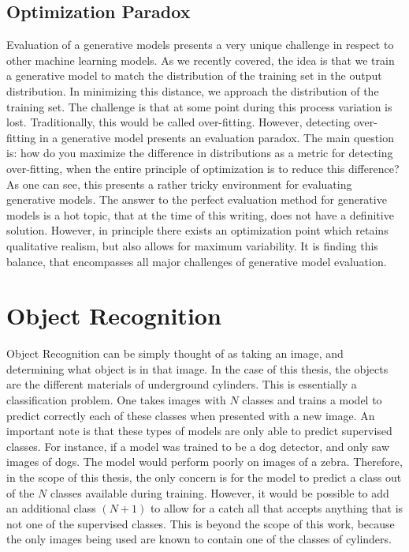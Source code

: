 \subsection{Optimization Paradox}\label{paradox}
Evaluation of a generative models presents a very unique challenge in respect to other machine learning models. As we recently covered, the idea is that we train a generative model to match the distribution of the training set in the output distribution. In minimizing this distance, we approach the distribution of the training set. The challenge is that at some point during this process variation is lost. Traditionally, this would be called over-fitting. However, detecting over-fitting in a generative model presents an evaluation paradox. The main question is: how do you maximize the difference in distributions as a metric for detecting over-fitting, when the entire principle of optimization is to reduce this difference? As one can see, this presents a rather tricky environment for evaluating generative models. The answer to the perfect evaluation method for generative models is a hot topic, that at the time of this writing, does not have a definitive solution. However, in principle there exists an optimization point which retains qualitative realism, but also allows for maximum variability. It is finding this balance, that encompasses all major challenges of generative model evaluation.


\section{Object Recognition}
Object Recognition can be simply thought of as taking an image, and determining what object is in that image. In the case of this thesis, the objects are the different materials of underground cylinders. This is essentially a classification problem. One takes images with $N$ classes and trains a model to predict correctly each of these classes when presented with a new image. An important note is that these types of models are only able to predict supervised classes. For instance, if a model was trained to be a dog detector, and only saw images of dogs. The model would perform poorly on images of a zebra. Therefore, in the scope of this thesis, the only concern is for the model to predict a class out of the $N$ classes available during training. However, it would be possible to add an additional class $(N+1)$ to allow for a catch all that accepts anything that is not one of the supervised classes. This is beyond the scope of this work, because the only images being used are known to contain one of the classes of cylinders.


